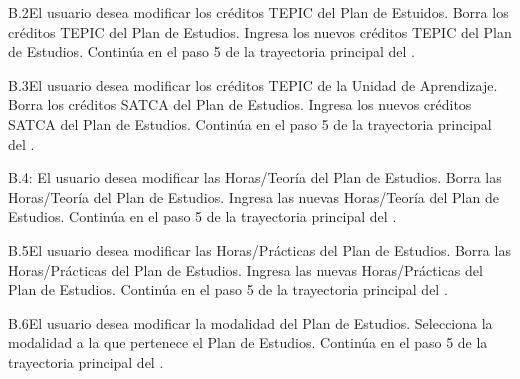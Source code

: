 
\begin{UCtrayectoriaA}{B.2}{El usuario desea modificar los créditos TEPIC del Plan de Estuidos.}
	\UCpaso[\UCactor] Borra los créditos TEPIC del Plan de Estudios.
	\UCpaso[\UCactor] Ingresa los nuevos créditos TEPIC del Plan de Estudios.
	\UCpaso Continúa en el paso 5 de la trayectoria principal del .
\end{UCtrayectoriaA}



\begin{UCtrayectoriaA}{B.3}{El usuario desea modificar los créditos TEPIC de la Unidad de Aprendizaje.}
	\UCpaso[\UCactor] Borra los créditos SATCA del Plan de Estudios.
	\UCpaso[\UCactor] Ingresa los nuevos créditos SATCA del Plan de Estudios.
	\UCpaso Continúa en el paso 5 de la trayectoria principal del .
\end{UCtrayectoriaA}



\begin{UCtrayectoriaA}{B.4}{: El usuario desea modificar las Horas/Teoría del Plan de Estudios.}
	\UCpaso[\UCactor] Borra las Horas/Teoría del Plan de Estudios.
	\UCpaso[\UCactor] Ingresa las nuevas Horas/Teoría del Plan de Estudios.
	\UCpaso Continúa en el paso 5 de la trayectoria principal del .
\end{UCtrayectoriaA}




\begin{UCtrayectoriaA}{B.5}{El usuario desea modificar las Horas/Prácticas del Plan de Estudios.}
	\UCpaso[\UCactor] Borra las Horas/Prácticas del Plan de Estudios.
	\UCpaso[\UCactor] Ingresa las nuevas Horas/Prácticas del Plan de Estudios.
	\UCpaso Continúa en el paso 5 de la trayectoria principal del .
\end{UCtrayectoriaA}




\begin{UCtrayectoriaA}{B.6}{El usuario desea modificar la modalidad del Plan de Estudios.}
	\UCpaso[\UCactor] Selecciona la modalidad a la que pertenece el Plan de Estudios.
	\UCpaso Continúa en el paso 5 de la trayectoria principal del .
\end{UCtrayectoriaA}



